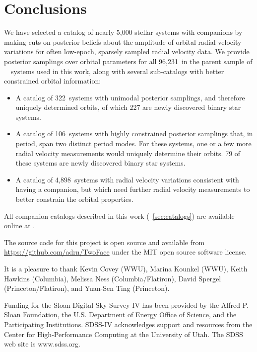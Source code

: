 \documentclass[modern, letterpaper]{aastex62}
\newcommand{\apogee}{\project{\acronym{APOGEE}}}
\newcommand{\DR}{\acronym{DR14}}
\newcommand{\nstars}{96,231}
\newcommand{\nhighK}{4,898}
\newcommand{\nbimodal}{106}
\newcommand{\nunimodal}{322}
\begin{document}
\section{Conclusions}

We have selected a catalog of nearly 5,000 stellar systems with companions by
making cuts on posterior beliefs about the amplitude of orbital radial velocity
variations for often low-epoch, sparsely sampled radial velocity data.
We provide posterior samplings over orbital parameters for all \nstars\ in the
parent sample of \apogee\ \DR\ systems used in this work, along with several
sub-catalogs with better constrained orbital information:
\begin{itemize}
    \item A catalog of \nunimodal\ systems with unimodal posterior samplings,
    and therefore uniquely determined orbits, of which 227 are newly discovered
    binary star systems.
    \item A catalog of \nbimodal\ systems with highly constrained posterior
    samplings that, in period, span two distinct period modes.
    For these systems, one or a few more radial velocity measurements would
    uniquely determine their orbits.
    79 of these systems are newly discovered binary star systems.
    \item A catalog of \nhighK\ systems with radial velocity variations
    consistent with having a companion, but which need further radial velocity
    measurements to better constrain the orbital properties.
\end{itemize}
All companion catalogs described in this work (\sectionname~\ref{sec:catalogs})
are available online at .

The source code for this project is open source and available from
\url{https://github.com/adrn/TwoFace} under the MIT open source software
license.

\acknowledgements

It is a pleasure to thank
Kevin Covey (WWU),
Marina Kounkel (WWU),
Keith Hawkins (Columbia),
Melissa Ness (Columbia/Flatiron),
David Spergel (Princeton/Flatiron),
and Yuan-Sen Ting (Princeton).

Funding for the Sloan Digital Sky Survey IV has been provided by the Alfred P. Sloan Foundation, the U.S. Department of Energy Office of Science, and the Participating Institutions. SDSS-IV acknowledges
support and resources from the Center for High-Performance Computing at
the University of Utah. The SDSS web site is www.sdss.org.
\end{document}
